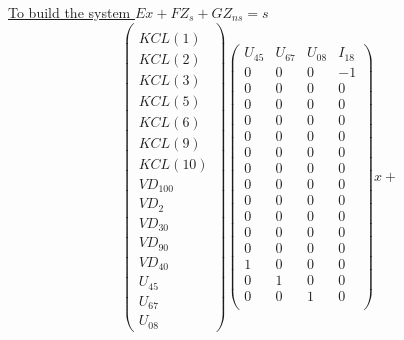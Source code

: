 \underline{To build the system $Ex+FZ_{s}+GZ_{ns}=s$}
\[
\left(\begin{array}{c}
  \\
KCL(1)\\KCL(2)\\KCL(3)\\KCL(5)\\KCL(6)\\KCL(9)\\KCL(10)\\VD_{100}\\VD_{2}\\VD_{30}\\VD_{90}\\VD_{40}\\U_{45}\\U_{67}\\U_{08}
\end{array}\right)
\left(\begin{array}{cccc}
  U_{45}&U_{67}&U_{08}&I_{18}\\
  \hline
  0&0&0&-1\\
  0&0&0&0\\
  0&0&0&0\\
  0&0&0&0\\
  0&0&0&0\\
  0&0&0&0\\
  0&0&0&0\\
  0&0&0&0\\
  0&0&0&0\\
  0&0&0&0\\
  0&0&0&0\\
  0&0&0&0\\
  1&0&0&0\\
  0&1&0&0\\
  0&0&1&0\\
\end{array}\right)x+\]
